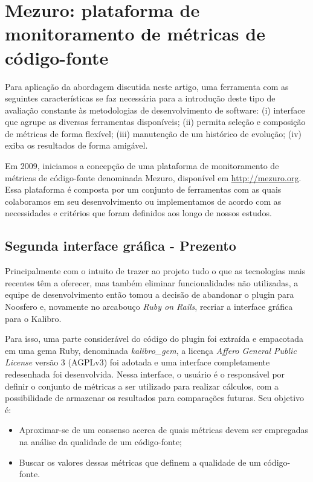 \documentclass{llncs}
\begin{document}

\section{Mezuro: plataforma de monitoramento de métricas de  código-fonte}
\label{sec:mezuro}

Para aplicação da abordagem discutida neste artigo, uma ferramenta com as
seguintes características se faz necessária para a introdução deste tipo de
avaliação constante às metodologias de desenvolvimento de software:
(i) interface que agrupe as diversas ferramentas disponíveis;
(ii) permita seleção e composição de métricas de forma flexível;
(iii) manutenção de um histórico de evolução;
(iv) exiba os resultados de forma amigável.

Em 2009, iniciamos a concepção de uma plataforma de monitoramento de métricas de código-fonte denominada Mezuro, disponível em {\url{http://mezuro.org}}. Essa plataforma é composta por um conjunto
de ferramentas com as quais colaboramos em seu desenvolvimento ou implementamos de acordo
com as necessidades e critérios que foram definidos aos longo de nossos estudos.
 
 \subsection{Segunda interface gráfica - Prezento}
\label{sec:segundo-prototipo}

Principalmente com o intuito de trazer ao projeto tudo o que as tecnologias mais recentes têm a oferecer, mas também eliminar funcionalidades não utilizadas, a equipe de desenvolvimento então tomou a decisão de abandonar o plugin para Noosfero e, novamente no arcabouço \textit{Ruby on Rails}, recriar a interface gráfica para o Kalibro.

  Para isso, uma parte considerável do código do plugin foi extraída e empacotada em uma gema Ruby, denominada \textit{kalibro\_gem}, a licença \textit{Affero General Public License} versão 3 (AGPLv3) foi adotada e uma interface completamente redesenhada foi desenvolvida. Nessa interface, o usuário é o responsável por definir o conjunto de métricas a ser utilizado para realizar cálculos, com a possibilidade de armazenar os resultados para comparações futuras. Seu objetivo é:

  \begin{itemize}
    \item Aproximar-se de um consenso acerca de quais métricas devem ser empregadas na análise da qualidade de um código-fonte;
    \item Buscar os valores dessas métricas que definem a qualidade de um código-fonte.
  \end{itemize}
\end{document}
